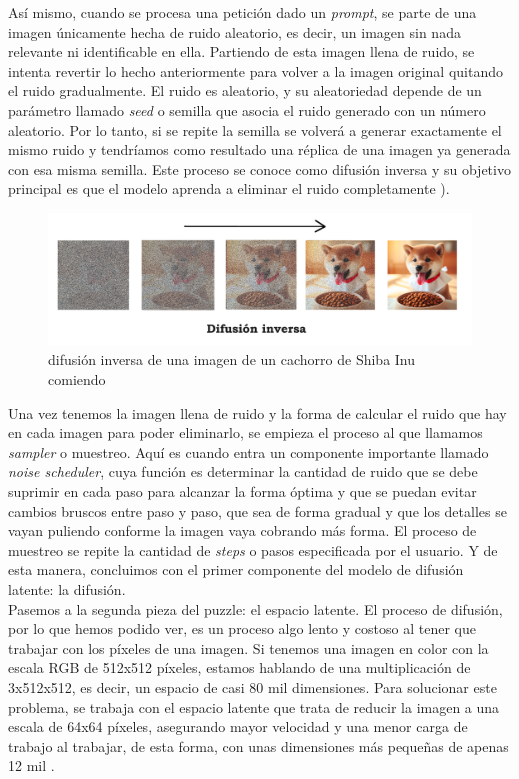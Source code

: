 Así mismo, cuando se procesa una petición dado un \textit{prompt}, se parte de una imagen únicamente hecha de ruido aleatorio, es decir, un imagen sin nada relevante ni identificable en ella. Partiendo de esta imagen llena de ruido, se intenta revertir lo hecho anteriormente para volver a la imagen original quitando el ruido gradualmente. El ruido es aleatorio, y su aleatoriedad depende de un parámetro llamado \textit{seed} o semilla que asocia el ruido generado con un número aleatorio. Por lo tanto, si se repite la semilla se volverá a generar exactamente el mismo ruido y tendríamos como resultado una réplica de una imagen ya generada con esa misma semilla. Este proceso se conoce como difusión inversa y su objetivo principal es que el modelo aprenda a eliminar el ruido completamente \citep{FelixSanzSD}). \\

\begin{figure}[h]
	\centering
	\includegraphics[width = 1 \textwidth]{Imagenes/Vectorial/difusioninversa.png}
	\caption{difusión inversa de una imagen de un cachorro de Shiba Inu comiendo}
	\label{fig:difusioninversa}
\end{figure}

Una vez tenemos la imagen llena de ruido y la forma de calcular el ruido que hay en cada imagen para poder eliminarlo, se empieza el proceso al que llamamos \textit{sampler} o muestreo. Aquí es cuando entra un componente importante llamado \textit{noise scheduler}, cuya función es determinar la cantidad de ruido que se debe suprimir en cada paso para alcanzar la forma óptima y que se puedan evitar cambios bruscos entre paso y paso, que sea de forma gradual y que los detalles se vayan puliendo conforme la imagen vaya cobrando más forma. El proceso de muestreo se repite la cantidad de \textit{steps} o pasos especificada por el usuario. Y de esta manera, concluimos con el primer componente del modelo de difusión latente: la difusión.\\ 

Pasemos a la segunda pieza del puzzle: el espacio latente. El proceso de difusión, por lo que hemos podido ver, es un proceso algo lento y costoso al tener que trabajar con los píxeles de una imagen. Si tenemos una imagen en color con la escala RGB de 512x512 píxeles, estamos hablando de una multiplicación de 3x512x512, es decir, un espacio de casi 80 mil dimensiones. Para solucionar este problema, se trabaja con el espacio latente que trata de reducir la imagen a una escala de 64x64 píxeles, asegurando mayor velocidad y una menor carga de trabajo al trabajar, de esta forma, con unas dimensiones más pequeñas de apenas 12 mil \citep{rombach2022high}. 

